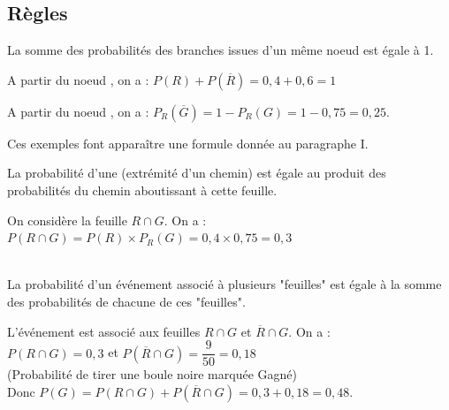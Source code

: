 \subsection{Règles}
\begin{bregle}
	La somme des probabilités des branches issues d'un même noeud est égale à 1.
\end{bregle}
\begin{bexemples}
    \begin{itemEx}
        \item A partir du noeud , on a : $P(R)+P(\overline{R})=0,4+0,6=1$ 
        \item A partir du noeud , on a : $P_R (\overline{G})=1-P_R(G)=1-0,75=0,25$.	
    \end{itemEx}
\end{bexemples}
Ces exemples font apparaître une formule donnée au paragraphe I.\\

\begin{bregle}
	La probabilité d'une  (extrémité d'un chemin) est égale au produit des probabilités du chemin aboutissant à cette feuille.
\end{bregle}
\begin{bexemple}
	On considère la feuille $R \cap G$.
    On a :\\
     $P(R \cap G)=P(R)\times P_R (G)=0,4\times 0,75=0,3$ 
\end{bexemple}

\begin{bregle}
	\\
	La probabilité d'un événement associé à plusieurs "feuilles" est égale à la somme des probabilités de chacune de ces "feuilles".
\end{bregle}
\begin{bexemple}
    L'événement  est associé aux feuilles $R \cap G$ et $\overline R \cap G$. On a :\\
    
    $P(R \cap G)=0,3$ et 
    $P(\overline R \cap G)= \dfrac{9}{50} = 0,18$\\ (Probabilité de tirer une boule noire marquée Gagné)\\
    Donc $P(G)=P(R \cap G)+P(\overline R \cap G)=0,3+0,18=0,48$.
\end{bexemple}

